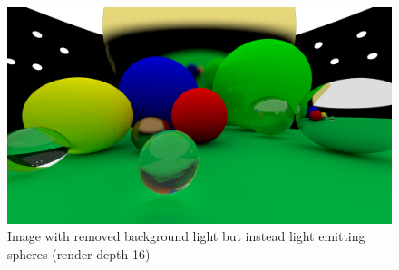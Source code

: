 \documentclass[12pt]{report}
\begin{document}
\begin{figure}[h!]
\includegraphics[width=\textwidth]{step8}
\centering
\caption{Image with removed background light but instead light emitting spheres (render depth 16)}
\label{fig:step8}
\end{figure}
\end{document}
